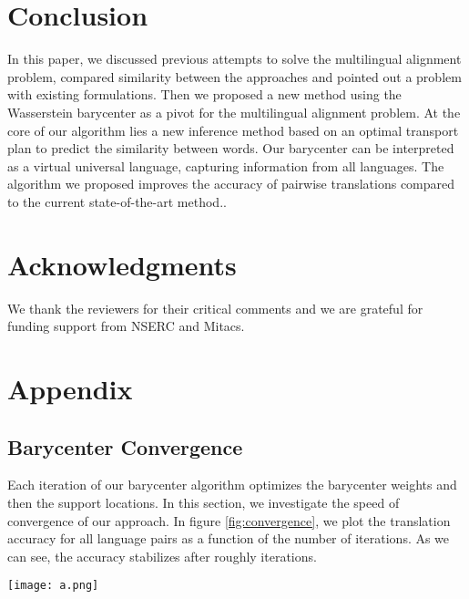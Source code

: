 \documentclass{article}
\begin{document}
\section{Conclusion}


In this paper, we discussed previous attempts to solve the multilingual alignment problem, compared similarity between the approaches and pointed out a problem with existing formulations.
Then we proposed a new method using the Wasserstein barycenter as a pivot for the multilingual alignment problem. 
At the core of our algorithm lies a new inference method based on an optimal transport plan to predict the similarity between words. 
Our barycenter can be interpreted as a virtual universal language, capturing information from all languages. 
The algorithm we proposed improves the accuracy of pairwise translations compared to the current state-of-the-art method..


\section*{Acknowledgments}

We thank the reviewers for their critical comments and we are grateful for funding support from 
NSERC and Mitacs.

 \clearpage





\section{Appendix}

\subsection{Barycenter Convergence} Each iteration of our barycenter algorithm optimizes the barycenter weights and then the support locations. In this section, we investigate the speed of convergence of our approach. 
In figure \ref{fig:convergence}, we plot the translation accuracy for all language pairs as a function of the number of iterations. As we can see, the accuracy stabilizes after roughly  iterations.

\begin{figure*}
    \centering
    \texttt{[image: a.png]}
    \caption{Translation accuracies for language pairs as a function of the number of iterations. The barycenter stabilizes after the -th iteration.}
    \label{fig:convergence}
\end{figure*}
\end{document}
